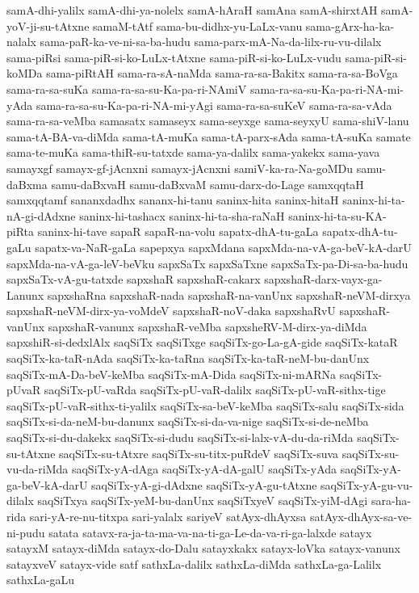 {samA-dhi-yalilx
samA-dhi-ya-nolelx
samA-hAraH
samAna
samA-shirxtAH
samA-yoV-ji-su-tAtxne
samaM-tAtf
sama-bu-didhx-yu-LaLx-vanu
sama-gArx-ha-ka-nalalx
sama-paR-ka-ve-ni-sa-ba-hudu
sama-parx-mA-Na-da-lilx-ru-vu-dilalx
sama-piRsi
sama-piR-si-ko-LuLx-tAtxne
sama-piR-si-ko-LuLx-vudu
sama-piR-si-koMDa
sama-piRtAH
sama-ra-sA-naMda
sama-ra-sa-Bakitx
sama-ra-sa-BoVga
sama-ra-sa-suKa
sama-ra-sa-su-Ka-pa-ri-NAmiV
sama-ra-sa-su-Ka-pa-ri-NA-mi-yAda
sama-ra-sa-su-Ka-pa-ri-NA-mi-yAgi
sama-ra-sa-suKeV
sama-ra-sa-vAda
sama-ra-sa-veMba
samasatx
samaseyx
sama-seyxge
sama-seyxyU
sama-shiV-lanu
sama-tA-BA-va-diMda
sama-tA-muKa
sama-tA-parx-sAda
sama-tA-suKa
samate
sama-te-muKa
sama-thiR-su-tatxde
sama-ya-dalilx
sama-yakekx
sama-yava
samayxgf
samayx-gf-jAcnxni
samayx-jAcnxni
samiV-ka-ra-Na-goMDu
samu-daBxma
samu-daBxvaH
samu-daBxvaM
samu-darx-do-Lage
samxqqtaH
samxqqtamf
sananxdadhx
sananx-hi-tanu
saninx-hita
saninx-hitaH
saninx-hi-ta-nA-gi-dAdxne
saninx-hi-tashacx
saninx-hi-ta-sha-raNaH
saninx-hi-ta-su-KA-piRta
saninx-hi-tave
sapaR
sapaR-na-volu
sapatx-dhA-tu-gaLa
sapatx-dhA-tu-gaLu
sapatx-va-NaR-gaLa
sapepxya
sapxMdana
sapxMda-na-vA-ga-beV-kA-darU
sapxMda-na-vA-ga-leV-beVku
sapxSaTx
sapxSaTxne
sapxSaTx-pa-Di-sa-ba-hudu
sapxSaTx-vA-gu-tatxde
sapxshaR
sapxshaR-cakarx
sapxshaR-darx-vayx-ga-Lanunx
sapxshaRna
sapxshaR-nada
sapxshaR-na-vanUnx
sapxshaR-neVM-dirxya
sapxshaR-neVM-dirx-ya-voMdeV
sapxshaR-noV-daka
sapxshaRvU
sapxshaR-vanUnx
sapxshaR-vanunx
sapxshaR-veMba
sapxsheRV-M-dirx-ya-diMda
sapxshiR-si-dedxlAlx
saqSiTx
saqSiTxge
saqSiTx-go-La-gA-gide
saqSiTx-kataR
saqSiTx-ka-taR-nAda
saqSiTx-ka-taRna
saqSiTx-ka-taR-neM-bu-danUnx
saqSiTx-mA-Da-beV-keMba
saqSiTx-mA-Dida
saqSiTx-ni-mARNa
saqSiTx-pUvaR
saqSiTx-pU-vaRda
saqSiTx-pU-vaR-dalilx
saqSiTx-pU-vaR-sithx-tige
saqSiTx-pU-vaR-sithx-ti-yalilx
saqSiTx-sa-beV-keMba
saqSiTx-salu
saqSiTx-sida
saqSiTx-si-da-neM-bu-danunx
saqSiTx-si-da-va-nige
saqSiTx-si-de-neMba
saqSiTx-si-du-dakekx
saqSiTx-si-dudu
saqSiTx-si-lalx-vA-du-da-riMda
saqSiTx-su-tAtxne
saqSiTx-su-tAtxre
saqSiTx-su-titx-puRdeV
saqSiTx-suva
saqSiTx-su-vu-da-riMda
saqSiTx-yA-dAga
saqSiTx-yA-dA-galU
saqSiTx-yAda
saqSiTx-yA-ga-beV-kA-darU
saqSiTx-yA-gi-dAdxne
saqSiTx-yA-gu-tAtxne
saqSiTx-yA-gu-vu-dilalx
saqSiTxya
saqSiTx-yeM-bu-danUnx
saqSiTxyeV
saqSiTx-yiM-dAgi
sara-ha-rida
sari-yA-re-nu-titxpa
sari-yalalx
sariyeV
satAyx-dhAyxsa
satAyx-dhAyx-sa-ve-ni-pudu
satata
satavx-ra-ja-ta-ma-va-na-ti-ga-Le-da-va-ri-ga-lalxde
satayx
satayxM
satayx-diMda
satayx-do-Dalu
satayxkakx
satayx-loVka
satayx-vanunx
satayxveV
satayx-vide
satf
sathxLa-dalilx
sathxLa-diMda
sathxLa-ga-Lalilx
sathxLa-gaLu
}
